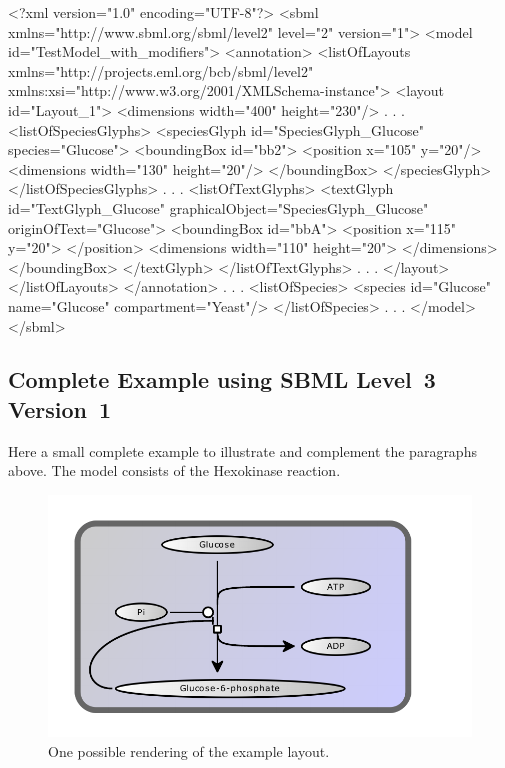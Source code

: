\begin{example}
<?xml version="1.0" encoding="UTF-8"?>
<sbml xmlns="http://www.sbml.org/sbml/level2" level="2" version="1">
  <model id="TestModel_with_modifiers">
    <annotation>
     <listOfLayouts xmlns="http://projects.eml.org/bcb/sbml/level2"
              xmlns:xsi="http://www.w3.org/2001/XMLSchema-instance">
      <layout id="Layout_1">
        <dimensions width="400" height="230"/>
                .
                .
                .
        <listOfSpeciesGlyphs>
          <speciesGlyph id="SpeciesGlyph_Glucose" species="Glucose">
            <boundingBox id="bb2">
              <position x="105" y="20"/>
              <dimensions width="130" height="20"/>
            </boundingBox>
          </speciesGlyph>
        </listOfSpeciesGlyphs>  
                .
                .
                .
        <listOfTextGlyphs>
          <textGlyph id="TextGlyph_Glucose" graphicalObject="SpeciesGlyph_Glucose"
                     originOfText="Glucose">
            <boundingBox id="bbA">
              <position x="115" y="20">
              </position>
              <dimensions width="110" height="20">
              </dimensions>
            </boundingBox>
          </textGlyph>
        </listOfTextGlyphs>  
            .
            .
            .
      </layout>
     </listOfLayouts>
    </annotation>    
         .
         .
         .
    <listOfSpecies>
      <species id="Glucose" name="Glucose" compartment="Yeast"/>
    </listOfSpecies>
       .
       .
       .  
  </model>
</sbml>
\end{example}

\subsection{Complete Example using SBML Level~3 Version~1}
Here a small complete example to illustrate and complement the 
paragraphs above. The model consists of the Hexokinase reaction. 

\begin{figure}[h]
\vspace*{-2em}
\hspace*{0.5in}\includegraphics{figures/layout-spec-example}
\vspace*{-2em}
\caption{One possible rendering of the example layout.}
\end{figure}

